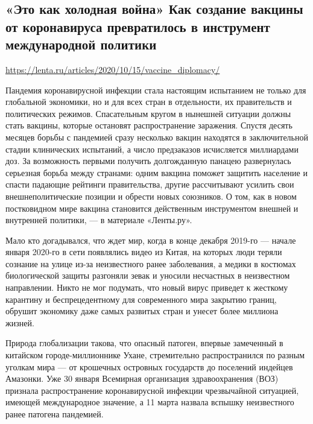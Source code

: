  
 

\subsection{«Это как холодная война» Как создание вакцины от коронавируса
превратилось в инструмент международной политики}

\url{https://lenta.ru/articles/2020/10/15/vaccine_diplomacy/}

Пандемия коронавирусной инфекции стала настоящим испытанием не только для
глобальной экономики, но и для всех стран в отдельности, их правительств и
политических режимов. Спасательным кругом в нынешней ситуации должны стать
вакцины, которые остановят распространение заражения. Спустя десять месяцев
борьбы с пандемией сразу несколько вакцин находятся в заключительной стадии
клинических испытаний, а число предзаказов исчисляется миллиардами доз. За
возможность первыми получить долгожданную панацею развернулась серьезная борьба
между странами: одним вакцина поможет защитить население и спасти падающие
рейтинги правительства, другие рассчитывают усилить свои внешнеполитические
позиции и обрести новых союзников. О том, как в новом постковидном мире вакцина
становится действенным инструментом внешней и внутренней политики, — в
материале «Ленты.ру».

Мало кто догадывался, что ждет мир, когда в конце декабря 2019-го — начале
января 2020-го в сети появлялись видео из Китая, на которых люди теряли
сознание на улице из-за неизвестного ранее заболевания, а медики в костюмах
биологической защиты разгоняли зевак и уносили несчастных в неизвестном
направлении. Никто не мог подумать, что новый вирус приведет к жесткому
карантину и беспрецедентному для современного мира закрытию границ, обрушит
экономику даже самых развитых стран и унесет более миллиона жизней.

Природа глобализации такова, что опасный патоген, впервые замеченный в
китайском городе-миллионнике Ухане, стремительно распространился по разным
уголкам мира — от крошечных островных государств до поселений индейцев
Амазонки. Уже 30 января Всемирная организация здравоохранения (ВОЗ) признала
распространение коронавирусной инфекции чрезвычайной ситуацией, имеющей
международное значение, а 11 марта назвала вспышку неизвестного ранее патогена
пандемией.

